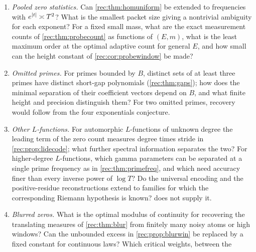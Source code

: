 \begin{enumerate}
\cref{rec:thm:coalesce}? Is \cref{rec:thm:micro} sharp for the actual zeros? Can one force an ordinate at
which exactly one of several given functions vanishes, at a comparable radius? How small can the
constants be made in terms of $q$ and the family, and how much error in locations and residues is
admissible? Does positive-fraction recovery (\cref{rec:thm:stable}) hold in every window of length
$T^\theta$ for a fixed $\theta<1$, what is an explicit admissible corruption fraction already for $q=4$, and
what precision in positions suffices when close ordinates may be merged? For a nonabelian class
function, what replaces the power-image rank when Artin factors share constituents or have poles?
\item \emph{Pooled zero statistics.} Can \cref{rec:thm:homuniform} be extended to frequencies with
$e^{\lvert t\rvert}\asymp T^2$? What is the smallest packet size giving a nontrivial ambiguity for each
exponent? For a fixed small mass, what are the exact measurement counts of
\cref{rec:thm:probecount} as functions of $(E,m)$, what is the least maximum order at the optimal
adaptive count for general $E$, and how small can the height constant of \cref{rec:cor:probewindow} be
made?
\item \emph{Omitted primes.} For primes bounded by $B$, distinct sets of at least three primes have
distinct short-gap polynomials (\cref{rec:thm:gaps}); how does the minimal separation of their
coefficient vectors depend on $B$, and what finite height and precision distinguish them? For two
omitted primes, recovery would follow from the four exponentials conjecture.
\item \emph{Other $L$-functions.} For automorphic $L$-functions of unknown degree the leading term of
the zero count measures degree times stride in \cref{rec:prop:lidecode}; what further spectral
information separates the two? For higher-degree $L$-functions, which gamma parameters can be
separated at a single prime frequency as in \cref{rec:thm:primefreq}, and which need accuracy finer
than every inverse power of $\log T$? Do the universal encoding and the positive-residue
reconstructions extend to families for which the corresponding Riemann hypothesis is known?
 does not supply it.
\item \emph{Blurred zeros.} What is the optimal modulus of continuity for recovering the translating measures
of \cref{rec:thm:blur} from finitely many noisy atoms or high windows? Can the unbounded excess in
\cref{rec:prop:blurwin} be replaced by a fixed constant for continuous laws? Which critical weights, between the

\end{enumerate}
